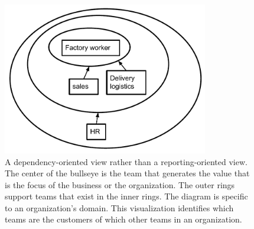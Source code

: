 \begin{figure}
\includegraphics[width=0.8\textwidth]{images/org_chart_wedding_cake_dependencies_-_manufacturing.pdf}
\caption{A dependency-oriented view rather than a reporting-oriented view. The center of the bullseye is the team that generates the value that is the focus of the business or the organization.
The outer rings support teams that exist in the inner rings. The diagram is specific to an organization's domain. This visualization identifies which teams are the customers of which other teams in an organization.}
\label{fig:org_chart_wedding_cake_manufacturing}
\end{figure}



